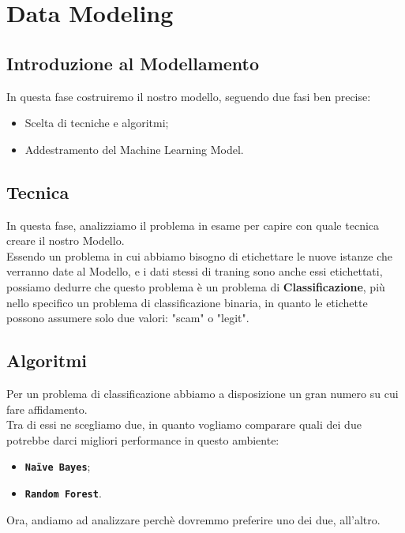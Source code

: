 \documentclass[a4paper,12pt]{report}
\begin{document}
\newpage

\begingroup%
\makeatletter%
\let\clearpage\relax%
\vspace*{\fill}%
\vspace*{\dimexpr-50\p@-\baselineskip}%
\chapter{Data Modeling}
\vspace*{\fill}%
\endgroup
\newpage

\section{Introduzione al Modellamento}
In questa fase costruiremo il nostro modello, seguendo due fasi ben precise:
\begin{itemize}
    \item Scelta di tecniche e algoritmi;
    \item Addestramento del Machine Learning Model.
\end{itemize}

\section{Tecnica}
In questa fase, analizziamo il problema in esame per capire con quale tecnica creare il nostro Modello.\\
Essendo un problema in cui abbiamo bisogno di etichettare le nuove istanze che verranno date al Modello, e i dati stessi di traning sono anche essi etichettati, possiamo dedurre che questo problema è un problema di \textbf{Classificazione}, più nello specifico un problema di classificazione binaria, in quanto le etichette possono assumere solo due valori: "scam" o "legit".

\section{Algoritmi}
Per un problema di classificazione abbiamo a disposizione un gran numero su cui fare affidamento.\\
Tra di essi ne scegliamo due, in quanto vogliamo comparare quali dei due potrebbe darci migliori performance in questo ambiente:
\begin{itemize}
    \item \texttt{\textbf{Naïve Bayes}};
    \item \texttt{\textbf{Random Forest}}.
\end{itemize}
Ora, andiamo ad analizzare perchè dovremmo preferire uno dei due, all'altro.
\end{document}
